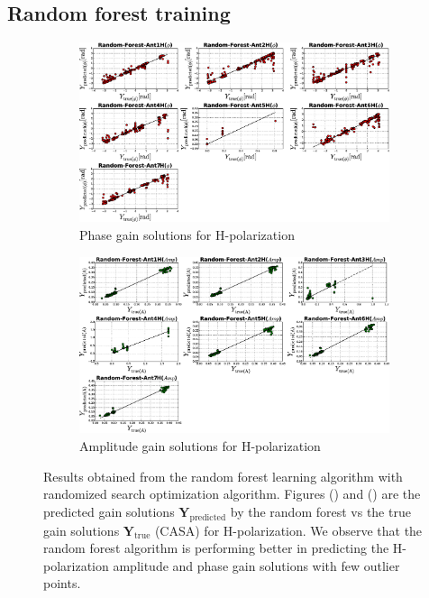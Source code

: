 \subsection{Random forest training}
\begin{figure}[H]
   \centering
    \begin{subfigure}[t]{0.52\textheight}
        
        \includegraphics[width=\textwidth]{images/Random-ForestHphase.eps} 
        \caption{Phase gain solutions for H-polarization} \label{A2}
    \end{subfigure}
    
      \begin{subfigure}[t]{0.52\textheight}
       
        \includegraphics[width=\textwidth]{images/Random-ForestHamp.eps} 
        \caption{Amplitude gain solutions for H-polarization} \label{B2}
    \end{subfigure}
    \caption{Results obtained from the random forest learning algorithm with randomized search optimization algorithm. Figures () and () are the predicted gain solutions $\textbf{Y}_\mathrm{predicted}$ by the random forest vs the true gain solutions $\textbf{Y}_\mathrm{true}$ (CASA) for H-polarization. We observe that the random forest algorithm is performing better in predicting the H-polarization amplitude and phase gain solutions with few outlier points.}
    \label{BB2}
    \end{figure}
    
